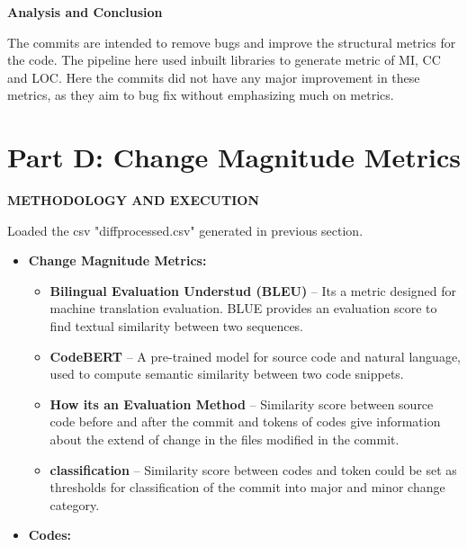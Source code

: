 \documentclass[12pt, a4paper]{report}
\newcommand{\sectionbar}[1]{%
  \vspace{0.6\baselineskip}%
  \noindent
  \colorbox{sectionbar}{%
    \parbox{\dimexpr\linewidth-2\fboxsep\relax}{%
      \textbf{\Large\textsf{#1}}%
    }%
  }%
  \vspace{0.6\baselineskip}
}
\begin{document}
\sectionbar{Analysis and Conclusion}

The commits are intended to remove bugs and improve the structural metrics for the code.
The pipeline here used inbuilt libraries to generate metric of MI, CC and LOC. Here the commits did not have any major improvement in these metrics, as they aim to bug fix without emphasizing much on metrics.

\cleardoublepage

\section{Part D: Change Magnitude Metrics}

\sectionbar{METHODOLOGY AND EXECUTION}
Loaded the csv "diffprocessed.csv" generated in previous section.

\begin{itemize}
    \item \textbf{Change Magnitude Metrics:}
    \begin{itemize}
        \item \textbf{Bilingual Evaluation Understud (BLEU)} -- Its a metric designed for machine translation evaluation. BLUE provides an evaluation score to find textual similarity between two sequences.
        \item \textbf{CodeBERT} -- A pre-trained model for source code and natural language, used to compute semantic similarity between two code snippets.
        \item \textbf{How its an Evaluation Method} -- Similarity score between source code before and after the commit and tokens of codes give information about the extend of change in the files modified in the commit.
        \item \textbf{classification} -- Similarity score between codes and token could be set as thresholds for classification of the commit into major and minor change category.
    \end{itemize}


    \item \textbf{Codes:}
    


\end{itemize}
\end{document}
